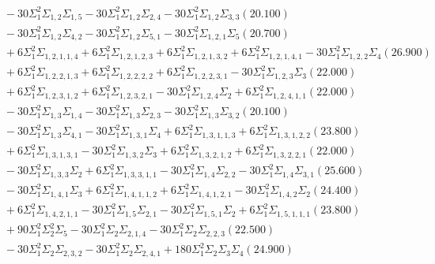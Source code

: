 \documentclass[12pt]{article}
\begin{document}
\begin{landscape}
\begin{align*}
		&\quad\quad -30\Sigma_{1}^{2}\Sigma_{1,2}\Sigma_{1,5}-30\Sigma_{1}^{2}\Sigma_{1,2}\Sigma_{2,4}-30\Sigma_{1}^{2}\Sigma_{1,2}\Sigma_{3,3}(20.100) \\ 
		&\quad\quad -30\Sigma_{1}^{2}\Sigma_{1,2}\Sigma_{4,2}-30\Sigma_{1}^{2}\Sigma_{1,2}\Sigma_{5,1}-30\Sigma_{1}^{2}\Sigma_{1,2,1}\Sigma_{5}(20.700) \\ 
		&\quad\quad +6\Sigma_{1}^{2}\Sigma_{1,2,1,1,4}+6\Sigma_{1}^{2}\Sigma_{1,2,1,2,3}+6\Sigma_{1}^{2}\Sigma_{1,2,1,3,2}+6\Sigma_{1}^{2}\Sigma_{1,2,1,4,1}-30\Sigma_{1}^{2}\Sigma_{1,2,2}\Sigma_{4}(26.900) \\ 
		&\quad\quad +6\Sigma_{1}^{2}\Sigma_{1,2,2,1,3}+6\Sigma_{1}^{2}\Sigma_{1,2,2,2,2}+6\Sigma_{1}^{2}\Sigma_{1,2,2,3,1}-30\Sigma_{1}^{2}\Sigma_{1,2,3}\Sigma_{3}(22.000) \\ 
		&\quad\quad +6\Sigma_{1}^{2}\Sigma_{1,2,3,1,2}+6\Sigma_{1}^{2}\Sigma_{1,2,3,2,1}-30\Sigma_{1}^{2}\Sigma_{1,2,4}\Sigma_{2}+6\Sigma_{1}^{2}\Sigma_{1,2,4,1,1}(22.000) \\ 
		&\quad\quad -30\Sigma_{1}^{2}\Sigma_{1,3}\Sigma_{1,4}-30\Sigma_{1}^{2}\Sigma_{1,3}\Sigma_{2,3}-30\Sigma_{1}^{2}\Sigma_{1,3}\Sigma_{3,2}(20.100) \\ 
		&\quad\quad -30\Sigma_{1}^{2}\Sigma_{1,3}\Sigma_{4,1}-30\Sigma_{1}^{2}\Sigma_{1,3,1}\Sigma_{4}+6\Sigma_{1}^{2}\Sigma_{1,3,1,1,3}+6\Sigma_{1}^{2}\Sigma_{1,3,1,2,2}(23.800) \\ 
		&\quad\quad +6\Sigma_{1}^{2}\Sigma_{1,3,1,3,1}-30\Sigma_{1}^{2}\Sigma_{1,3,2}\Sigma_{3}+6\Sigma_{1}^{2}\Sigma_{1,3,2,1,2}+6\Sigma_{1}^{2}\Sigma_{1,3,2,2,1}(22.000) \\ 
		&\quad\quad -30\Sigma_{1}^{2}\Sigma_{1,3,3}\Sigma_{2}+6\Sigma_{1}^{2}\Sigma_{1,3,3,1,1}-30\Sigma_{1}^{2}\Sigma_{1,4}\Sigma_{2,2}-30\Sigma_{1}^{2}\Sigma_{1,4}\Sigma_{3,1}(25.600) \\ 
		&\quad\quad -30\Sigma_{1}^{2}\Sigma_{1,4,1}\Sigma_{3}+6\Sigma_{1}^{2}\Sigma_{1,4,1,1,2}+6\Sigma_{1}^{2}\Sigma_{1,4,1,2,1}-30\Sigma_{1}^{2}\Sigma_{1,4,2}\Sigma_{2}(24.400) \\ 
		&\quad\quad +6\Sigma_{1}^{2}\Sigma_{1,4,2,1,1}-30\Sigma_{1}^{2}\Sigma_{1,5}\Sigma_{2,1}-30\Sigma_{1}^{2}\Sigma_{1,5,1}\Sigma_{2}+6\Sigma_{1}^{2}\Sigma_{1,5,1,1,1}(23.800) \\ 
		&\quad\quad +90\Sigma_{1}^{2}\Sigma_{2}^{2}\Sigma_{5}-30\Sigma_{1}^{2}\Sigma_{2}\Sigma_{2,1,4}-30\Sigma_{1}^{2}\Sigma_{2}\Sigma_{2,2,3}(22.500) \\ 
		&\quad\quad -30\Sigma_{1}^{2}\Sigma_{2}\Sigma_{2,3,2}-30\Sigma_{1}^{2}\Sigma_{2}\Sigma_{2,4,1}+180\Sigma_{1}^{2}\Sigma_{2}\Sigma_{3}\Sigma_{4}(24.900) \\ 

\end{align*}
\end{landscape}
\end{document}
